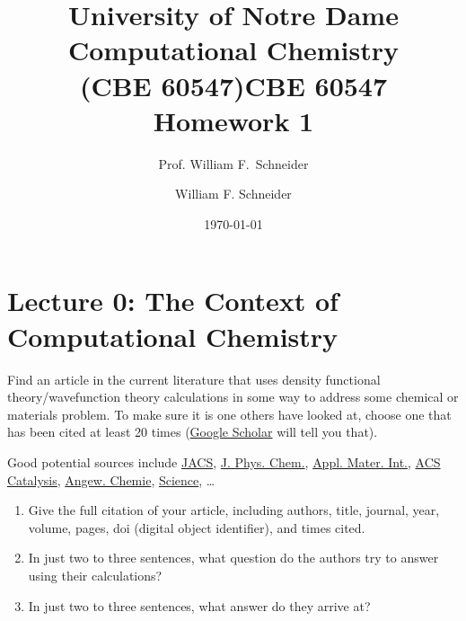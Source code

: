\documentclass[11pt]{article}
\title{University of Notre Dame\\Computational Chemistry\\(CBE 60547)}
\author{Prof. William F.\ Schneider}
\author{William F. Schneider}
\date{\today}
\title{CBE 60547 Homework 1}
\begin{document}
\begin{OPTIONS}
\end{OPTIONS}
\section{Lecture 0: The Context of Computational Chemistry}
\label{sec:org84efaa9}
Find an article in the current literature that uses density functional
theory/wavefunction theory calculations in some way to address some
chemical or materials problem.  To make sure it is one others have looked at, choose one that has been cited at least 20 times (\href{http://scholar.google.com}{Google Scholar} will tell you that).

\noindent Good potential sources include \href{https://pubs.acs.org/journal/jacsat}{JACS}, \href{https://pubs.acs.org/journal/jpccck}{J. Phys. Chem.}, \href{https://pubs.acs.org/journal/aamick}{Appl. Mater. Int.}, \href{https://pubs.acs.org/journal/accacs}{ACS Catalysis}, \href{https://onlinelibrary.wiley.com/journal/15213773}{Angew. Chemie},  \href{https://www.sciencemag.org/}{Science}, \ldots

\begin{enumerate}
\item Give the full citation of your article, including authors,
title, journal, year, volume, pages,  doi (digital object identifier), and times cited.
\item In just two to three sentences, what question do the authors try
to answer using their calculations?
\item In just two to three sentences, what answer do they arrive at?
\end{enumerate}
\end{document}
